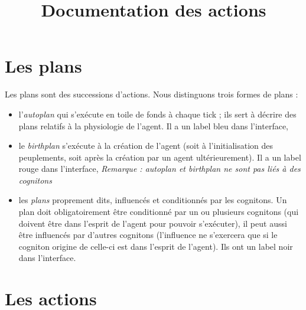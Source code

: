\documentclass[a4paper,oneside,12 pt]{article}
\title{Documentation des actions }
\begin{document}
\maketitle
\part{Les plans}

Les plans sont des successions d'actions.
Nous distinguons trois formes de plans :
\begin{itemize}
\item  l'\textit{autoplan} qui s'exécute en toile de fonds à chaque tick ; ils sert à décrire des plans relatifs à la physiologie de l'agent. Il a un label bleu dans l'interface,
\item le\textit{ birthplan} s'exécute à la création de l'agent (soit à l'initialisation des peuplements, soit après la création par un agent ultérieurement). Il a un label rouge dans l'interface,
\textit{Remarque : autoplan et birthplan ne sont pas liés à des cognitons}
\item les \textit{plans} proprement dits, influencés et conditionnés par les cognitons. Un plan doit obligatoirement être conditionné par un ou plusieurs cognitons (qui doivent être dans l'esprit de l'agent pour pouvoir s'exécuter), il peut aussi être influencés par d'autres cognitons (l'influence ne s'exercera que si le cogniton origine de celle-ci est dans l'esprit de l'agent). Ils ont un label noir dans l'interface.
\end{itemize}

\part{Les actions}

	
	
	
\end{document}
